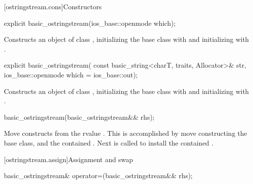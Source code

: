 [ostringstream.cons]{Constructors}

%
\begin{itemdecl}
explicit basic_ostringstream(ios_base::openmode which);
\end{itemdecl}

\begin{itemdescr}
\pnum
\effects
Constructs an object of class
,
initializing the base class with
and initializing  with\linebreak %
.
\end{itemdescr}

%
\begin{itemdecl}
explicit basic_ostringstream(
  const basic_string<charT, traits, Allocator>& str,
  ios_base::openmode which = ios_base::out);
\end{itemdecl}

\begin{itemdescr}
\pnum
\effects
Constructs an object of class
,
initializing the base class with
and initializing  with\linebreak %
.
\end{itemdescr}

%
\begin{itemdecl}
basic_ostringstream(basic_ostringstream&& rhs);
\end{itemdecl}

\begin{itemdescr}
\pnum
\effects Move constructs from the rvalue . This
is accomplished by move constructing the base class, and the contained
.
Next 
is called to
install the contained .
\end{itemdescr}

[ostringstream.assign]{Assignment and swap}

%
\begin{itemdecl}
basic_ostringstream& operator=(basic_ostringstream&& rhs);
\end{itemdecl}

